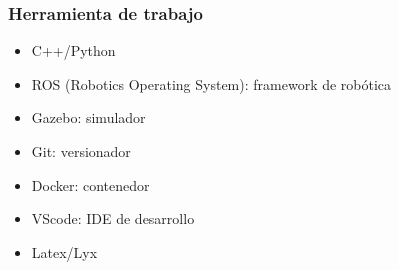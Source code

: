 \begin{frame}
    \frametitle{Herramienta de trabajo}

    \begin{itemize}
        \item C++/Python
        \item ROS (Robotics Operating System): framework de robótica
        \item Gazebo: simulador
        \item Git: versionador
        \item Docker: contenedor
        \item VScode: IDE de desarrollo
        \item Latex/Lyx
    \end{itemize}

\end{frame}